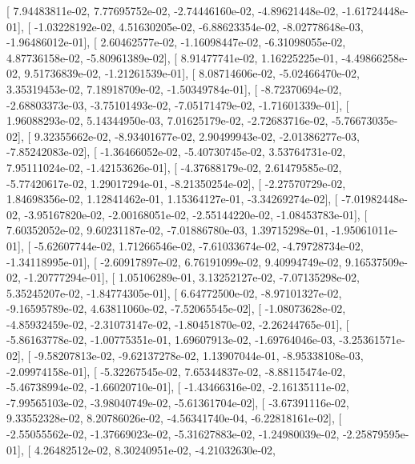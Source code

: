 \documentclass{article}
\begin{document}
       [  7.94483811e-02,   7.77695752e-02,  -2.74446160e-02,
         -4.89621448e-02,  -1.61724448e-01],
       [ -1.03228192e-02,   4.51630205e-02,  -6.88623354e-02,
         -8.02778648e-03,  -1.96486012e-01],
       [  2.60462577e-02,  -1.16098447e-02,  -6.31098055e-02,
          4.87736158e-02,  -5.80961389e-02],
       [  8.91477741e-02,   1.16225225e-01,  -4.49866258e-02,
          9.51736839e-02,  -1.21261539e-01],
       [  8.08714606e-02,  -5.02466470e-02,   3.35319453e-02,
          7.18918709e-02,  -1.50349784e-01],
       [ -8.72370694e-02,  -2.68803373e-03,  -3.75101493e-02,
         -7.05171479e-02,  -1.71601339e-01],
       [  1.96088293e-02,   5.14344950e-03,   7.01625179e-02,
         -2.72683716e-02,  -5.76673035e-02],
       [  9.32355662e-02,  -8.93401677e-02,   2.90499943e-02,
         -2.01386277e-03,  -7.85242083e-02],
       [ -1.36466052e-02,  -5.40730745e-02,   3.53764731e-02,
          7.95111024e-02,  -1.42153626e-01],
       [ -4.37688179e-02,   2.61479585e-02,  -5.77420617e-02,
          1.29017294e-01,  -8.21350254e-02],
       [ -2.27570729e-02,   1.84698356e-02,   1.12841462e-01,
          1.15364127e-01,  -3.34269274e-02],
       [ -7.01982448e-02,  -3.95167820e-02,  -2.00168051e-02,
         -2.55144220e-02,  -1.08453783e-01],
       [  7.60352052e-02,   9.60231187e-02,  -7.01886780e-03,
          1.39715298e-01,  -1.95061011e-01],
       [ -5.62607744e-02,   1.71266546e-02,  -7.61033674e-02,
         -4.79728734e-02,  -1.34118995e-01],
       [ -2.60917897e-02,   6.76191099e-02,   9.40994749e-02,
          9.16537509e-02,  -1.20777294e-01],
       [  1.05106289e-01,   3.13252127e-02,  -7.07135298e-02,
          5.35245207e-02,  -1.84774305e-01],
       [  6.64772500e-02,  -8.97101327e-02,  -9.16595789e-02,
          4.63811060e-02,  -7.52065545e-02],
       [ -1.08073628e-02,  -4.85932459e-02,  -2.31073147e-02,
         -1.80451870e-02,  -2.26244765e-01],
       [ -5.86163778e-02,  -1.00775351e-01,   1.69607913e-02,
         -1.69764046e-03,  -3.25361571e-02],
       [ -9.58207813e-02,  -9.62137278e-02,   1.13907044e-01,
         -8.95338108e-03,  -2.09974158e-01],
       [ -5.32267545e-02,   7.65344837e-02,  -8.88115474e-02,
         -5.46738994e-02,  -1.66020710e-01],
       [ -1.43466316e-02,  -2.16135111e-02,  -7.99565103e-02,
         -3.98040749e-02,  -5.61361704e-02],
       [ -3.67391116e-02,   9.33552328e-02,   8.20786026e-02,
         -4.56341740e-04,  -6.22818161e-02],
       [ -2.55055562e-02,  -1.37669023e-02,  -5.31627883e-02,
         -1.24980039e-02,  -2.25879595e-01],
       [  4.26482512e-02,   8.30240951e-02,  -4.21032630e-02,
\end{document}
